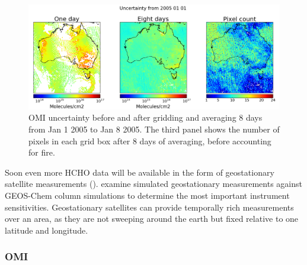     
    \begin{figure}[!htbp]
      \includegraphics[width=\textwidth]{Figures/HCHO/Uncertainty.png}
      \caption{%
        OMI uncertainty before and after gridding and averaging 8 days from Jan 1 2005 to Jan 8 2005.
        The third panel shows the number of pixels in each grid box after 8 days of averaging, before accounting for fire.
      }
      \label{Model:Meas:sat:fig_averagingUncertainty}
    \end{figure}
    
    Soon even more HCHO data will be available in the form of geostationary satellite measurements (\textcite{Kwon2017}).
    \textcite{Kwon2017} examine simulated geostationary measurements against GEOS-Chem column simulations to determine the most important instrument sensitivities.
    Geostationary satellites can provide temporally rich measurements over an area, as they are not sweeping around the earth but fixed relative to one latitude and longitude.
    
    \subsubsection{OMI}
    
